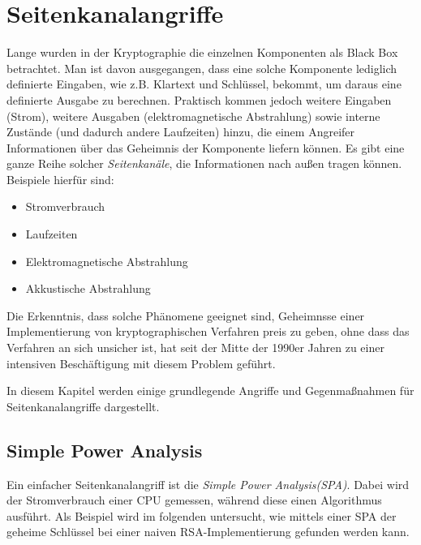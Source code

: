 \chapter{Seitenkanalangriffe}
\label{sec:seitenkanalangriffe}
Lange wurden in der Kryptographie die einzelnen Komponenten als Black
Box betrachtet. Man ist davon ausgegangen, dass eine solche Komponente
lediglich definierte Eingaben, wie z.B. Klartext und Schlüssel, bekommt,
um daraus eine definierte Ausgabe zu berechnen. Praktisch kommen jedoch
weitere Eingaben (Strom), weitere Ausgaben (elektromagnetische
Abstrahlung) sowie interne Zustände (und dadurch andere Laufzeiten)
hinzu, die einem Angreifer Informationen über das Geheimnis der
Komponente liefern können. Es gibt eine ganze Reihe solcher
\emph{Seitenkanäle}, die Informationen nach außen tragen
können. Beispiele hierfür sind:
\begin{itemize}
\item Stromverbrauch
\item Laufzeiten
\item Elektromagnetische Abstrahlung
\item Akkustische Abstrahlung
\end{itemize}

Die Erkenntnis, dass solche Phänomene geeignet sind, Geheimnsse einer
Implementierung von kryptographischen Verfahren preis zu geben, ohne
dass das Verfahren an sich unsicher ist, hat seit der Mitte der 1990er
Jahren zu einer intensiven Beschäftigung mit diesem Problem geführt. 

In diesem Kapitel werden einige grundlegende Angriffe und Gegenmaßnahmen
für Seitenkanalangriffe dargestellt.

\section{Simple Power Analysis}
\label{sec:simple-power-analys}
Ein einfacher Seitenkanalangriff ist die \emph{Simple Power
  Analysis(SPA)}. Dabei wird der Stromverbrauch einer CPU gemessen,
während diese einen Algorithmus ausführt. Als Beispiel wird im folgenden
untersucht, wie mittels einer SPA der geheime Schlüssel bei einer naiven
RSA-Implementierung gefunden werden kann.
